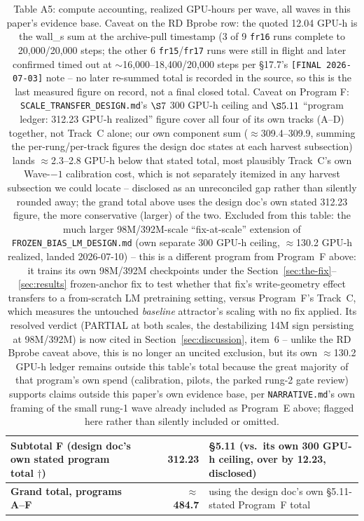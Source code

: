 \begin{table}[htbp]
\begin{tabular}{p{3.6cm}p{3.6cm}p{5.6cm}rl}
\textbf{Subtotal F (design doc's own stated program total} $\dagger$\textbf{)} & & & \textbf{312.23} & \S5.11 (vs.\ its own 300 GPU-h ceiling, over by 12.23, disclosed) \\
\midrule
\textbf{Grand total, programs A--F} & & & \textbf{$\approx$484.7} & using the design doc's own \S5.11-stated Program~F total \\
\bottomrule
\end{tabular}
\caption{Table A5: compute accounting, realized GPU-hours per wave, all
waves in this paper's evidence base. Caveat on the RD Bprobe row: the
quoted 12.04 GPU-h is the wall\_s sum at the archive-pull timestamp (3 of
9 \texttt{fr16} runs complete to 20{,}000/20{,}000 steps; the other 6
\texttt{fr15}/\texttt{fr17} runs were still in flight and later confirmed
timed out at $\sim$16{,}000--18{,}400/20{,}000 steps per \S17.7's
\texttt{[FINAL 2026-07-03]} note -- no later re-summed total is recorded
in the source, so this is the last measured figure on record, not a final
closed total. Caveat on Program F: \texttt{SCALE\_TRANSFER\_DESIGN.md}'s
$\S7$ 300 GPU-h ceiling and $\S5.11$ ``program ledger: 312.23 GPU-h
realized'' figure cover all four of its own tracks (A--D) together, not
Track~C alone; our own component sum ($\approx$309.4--309.9, summing the
per-rung/per-track figures the design doc states at each harvest
subsection) lands $\approx$2.3--2.8 GPU-h below that stated total, most
plausibly Track~C's own Wave-$-1$ calibration cost, which is not
separately itemized in any harvest subsection we could locate --
disclosed as an unreconciled gap rather than silently rounded away; the
grand total above uses the design doc's own stated 312.23 figure, the
more conservative (larger) of the two. Excluded from this table: the
much larger 98M/392M-scale ``fix-at-scale'' extension of
\texttt{FROZEN\_BIAS\_LM\_DESIGN.md} (own separate 300 GPU-h ceiling,
$\approx$130.2 GPU-h realized, landed 2026-07-10) -- this is a different
program from Program~F above: it trains its own 98M/392M checkpoints
under the Section~\ref{sec:the-fix}--\ref{sec:results} frozen-anchor fix
to test whether that fix's write-geometry effect transfers to a
from-scratch LM pretraining setting, versus Program~F's Track~C, which
measures the untouched \emph{baseline} attractor's scaling with no fix
applied. Its resolved verdict (PARTIAL at both scales, the destabilizing
14M sign persisting at 98M/392M) is now cited in
Section~\ref{sec:discussion}, item~6 -- unlike the RD Bprobe caveat above,
this is no longer an uncited exclusion, but its own $\approx$130.2 GPU-h
ledger remains outside this table's total because the great majority of
that program's own spend (calibration, pilots, the parked rung-2 gate
review) supports claims outside this paper's own evidence base, per
\texttt{NARRATIVE.md}'s own framing of the small rung-1 wave already
included as Program~E above; flagged here rather than silently included
or omitted.}
\end{table}
